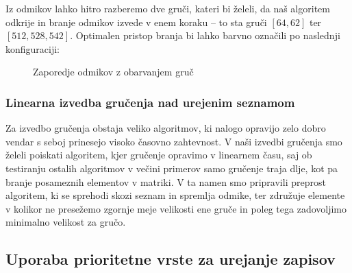 \documentclass[a4paper,12pt,openright]{book}
\begin{document}
\noindent Iz odmikov lahko hitro razberemo dve gruči, kateri bi želeli, da naš algoritem odkrije in branje odmikov izvede v enem koraku – to sta gruči $[64, 62]$ ter $[512, 528, 542]$. Optimalen pristop branja bi lahko barvno označili po naslednji konfiguraciji:

\hfill \break
\begin{figure}[H]
\begin{center}
\caption{Zaporedje odmikov z obarvanjem gruč}
\end{center}
\end{figure}
        
        \subsubsection{Linearna izvedba gručenja nad urejenim seznamom}
        Za izvedbo gručenja obstaja veliko algoritmov, ki nalogo opravijo zelo dobro vendar s seboj prinesejo visoko časovno zahtevnost. V naši izvedbi gručenja smo želeli poiskati algoritem, kjer gručenje opravimo v linearnem času, saj ob testiranju ostalih algoritmov v večini primerov samo gručenje traja dlje, kot pa branje posameznih elementov v matriki. V ta namen smo pripravili preprost algoritem, ki se sprehodi skozi seznam in spremlja odmike, ter združuje elemente v kolikor ne presežemo zgornje meje velikosti ene gruče in poleg tega zadovoljimo minimalno velikost za gručo.
        
        \subsection{Uporaba prioritetne vrste za urejanje zapisov}
\end{document}
